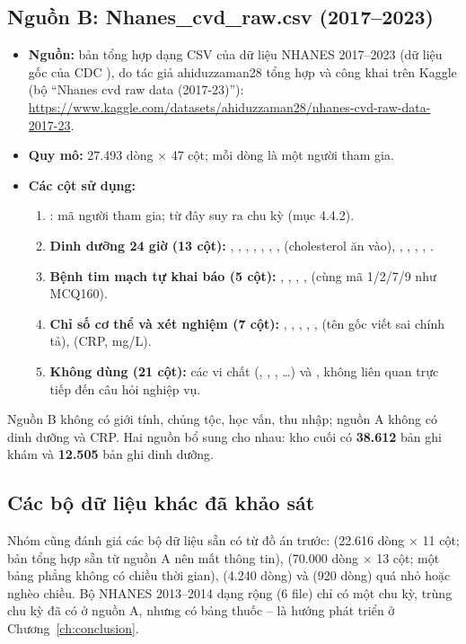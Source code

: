 \subsection{Nguồn B: Nhanes\_cvd\_raw.csv (2017--2023)}
\begin{itemize}
\item \textbf{Nguồn:} bản tổng hợp dạng CSV của dữ liệu NHANES 2017--2023 (dữ liệu gốc của CDC \cite{nhanes}), do tác giả ahiduzzaman28 tổng hợp và công khai trên Kaggle (bộ ``Nhanes cvd raw data (2017-23)''): \url{https://www.kaggle.com/datasets/ahiduzzaman28/nhanes-cvd-raw-data-2017-23}.
\item \textbf{Quy mô:} 27.493 dòng $\times$ 47 cột; mỗi dòng là một người tham gia.
\item \textbf{Các cột sử dụng:}
\begin{enumerate}
\item {}: mã người tham gia; từ đây suy ra chu kỳ (mục 4.4.2).
\item \textbf{Dinh dưỡng 24 giờ (13 cột):} , , , , , , ,  (cholesterol ăn vào), , , , , .
\item \textbf{Bệnh tim mạch tự khai báo (5 cột):} , , , ,  (cùng mã 1/2/7/9 như MCQ160).
\item \textbf{Chỉ số cơ thể và xét nghiệm (7 cột):} , , , , ,  (tên gốc viết sai chính tả),  (CRP, mg/L).
\item \textbf{Không dùng (21 cột):} các vi chất (, , , \ldots) và , không liên quan trực tiếp đến câu hỏi nghiệp vụ.
\end{enumerate}
\end{itemize}
Nguồn B không có giới tính, chủng tộc, học vấn, thu nhập; nguồn A không có dinh dưỡng và CRP. Hai nguồn bổ sung cho nhau: kho cuối có \textbf{38.612} bản ghi khám và \textbf{12.505} bản ghi dinh dưỡng.

\subsection{Các bộ dữ liệu khác đã khảo sát}
Nhóm cũng đánh giá các bộ dữ liệu sẵn có từ đồ án trước:  (22.616 dòng $\times$ 11 cột; bản tổng hợp sẵn từ nguồn A nên mất thông tin),  (70.000 dòng $\times$ 13 cột; một bảng phẳng không có chiều thời gian),  (4.240 dòng) và  (920 dòng) quá nhỏ hoặc nghèo chiều. Bộ NHANES 2013--2014 dạng rộng (6 file) chỉ có một chu kỳ, trùng chu kỳ đã có ở nguồn A, nhưng có bảng thuốc -- là hướng phát triển ở Chương~\ref{ch:conclusion}.

